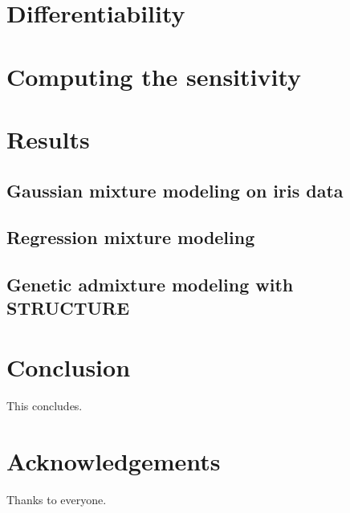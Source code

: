 \documentclass[11pt]{article}
\begin{document}
\section{Differentiability}


% 


\section{Computing the sensitivity}


\section{Results}


    \subsection{Gaussian mixture modeling on iris data}
    

    \subsection{Regression mixture modeling}
    

    \subsection{Genetic admixture modeling with STRUCTURE}
    

\section{Conclusion}
This concludes.


\section{Acknowledgements}
Thanks to everyone.

\end{document}
